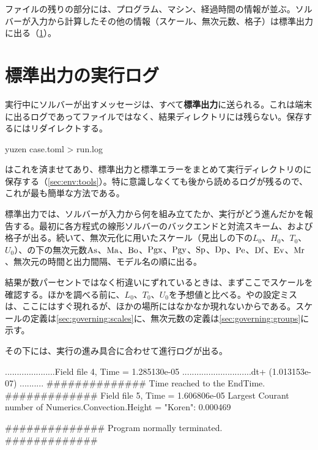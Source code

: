 ファイルの残りの部分には、プログラム、マシン、経過時間の情報が並ぶ。ソルバーが入力から計算したその他の情報（スケール、無次元数、格子）は標準出力に出る（\cref{sec:output:running}）。

\section{標準出力の実行ログ}
\label{sec:output:running}

実行中にソルバーが出すメッセージは、すべて\textbf{標準出力}に送られる。これは端末に出るログであってファイルではなく、結果ディレクトリには残らない。保存するにはリダイレクトする。

\begin{shell}
yuzen case.toml > run.log
\end{shell}

はこれを済ませてあり、標準出力と標準エラーをまとめて実行ディレクトリのに保存する（\cref{sec:env:tools}）。特に意識しなくても後から読めるログが残るので、これが最も簡単な方法である。

標準出力では、ソルバーが入力から何を組み立てたか、実行がどう進んだかを報告する。最初に各方程式の線形ソルバーのバックエンドと対流スキーム、および格子が出る。続いて、無次元化に用いたスケール（見出しの下の$L_0$、$H_0$、$T_0$、$U_0$）、の下の無次元数$\mathrm{As}$、$\mathrm{Ma}$、$\mathrm{Bo}$、$\mathrm{Pgx}$、$\mathrm{Pgy}$、$\mathrm{Sp}$、$\mathrm{Dp}$、$\mathrm{Pe}$、$\mathrm{Df}$、$\mathrm{Ev}$、$\mathrm{Mr}$、無次元の時間と出力間隔、モデル名の順に出る。

結果が数パーセントではなく桁違いにずれているときは、まずここでスケールを確認する。ほかを調べる前に、$L_0$、$T_0$、$U_0$を予想値と比べる。やの設定ミスは、ここにはすぐ現れるが、ほかの場所にはなかなか現れないからである。スケールの定義は\cref{sec:governing:scales}に、無次元数の定義は\cref{sec:governing:groups}に示す。

その下には、実行の進み具合に合わせて進行ログが出る。

\begin{plain}
.....................Field file 4, Time = 1.285130e-05
.............................dt+ (1.013153e-07)
..........
############## Time reached to the EndTime. #############
Field file 5, Time = 1.606806e-05
Largest Courant number of Numerics.Convection.Height = "Koren": 0.000469

############## Program normally terminated. #############
\end{plain}

